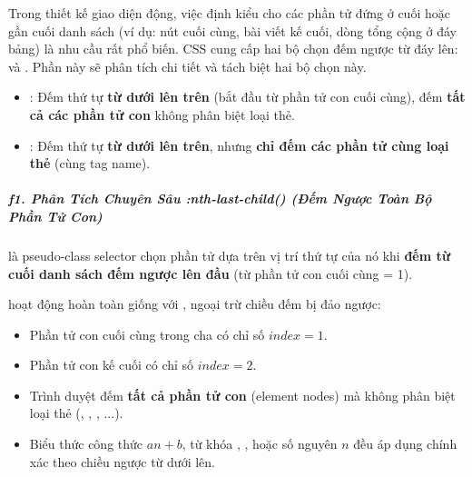 Trong thiết kế giao diện động, việc định kiểu cho các phần tử đứng ở cuối hoặc gần cuối danh sách (ví dụ: nút cuối cùng, bài viết kế cuối, dòng tổng cộng ở đáy bảng) là nhu cầu rất phổ biến. CSS cung cấp hai bộ chọn đếm ngược từ đáy lên:  và . Phần này sẽ phân tích chi tiết và tách biệt hai bộ chọn này.

\begin{conceptBox}
\begin{itemize}[leftmargin=1.5em, itemsep=3pt, parsep=0pt]
    \item {}: Đếm thứ tự \textbf{từ dưới lên trên} (bắt đầu từ phần tử con cuối cùng), đếm \textbf{tất cả các phần tử con} không phân biệt loại thẻ.
    \item {}: Đếm thứ tự \textbf{từ dưới lên trên}, nhưng \textbf{chỉ đếm các phần tử cùng loại thẻ} (cùng tag name).
\end{itemize}
\end{conceptBox}


\subparagraph{f1. Phân Tích Chuyên Sâu :nth-last-child() (Đếm Ngược Toàn Bộ Phần Tử Con)}

 là pseudo-class selector chọn phần tử dựa trên vị trí thứ tự của nó khi \textbf{đếm từ cuối danh sách đếm ngược lên đầu} (từ phần tử con cuối cùng = 1).

\begin{conceptBox}
 hoạt động hoàn toàn giống với , ngoại trừ chiều đếm bị đảo ngược:
\begin{itemize}[leftmargin=1.5em, itemsep=2pt, parsep=0pt]
    \item Phần tử con cuối cùng trong cha có chỉ số $index = 1$.
    \item Phần tử con kế cuối có chỉ số $index = 2$.
    \item Trình duyệt đếm \textbf{tất cả phần tử con} (element nodes) mà không phân biệt loại thẻ (, , , ...).
    \item Biểu thức công thức $an + b$, từ khóa , , hoặc số nguyên $n$ đều áp dụng chính xác theo chiều ngược từ dưới lên.
\end{itemize}
\end{conceptBox}

